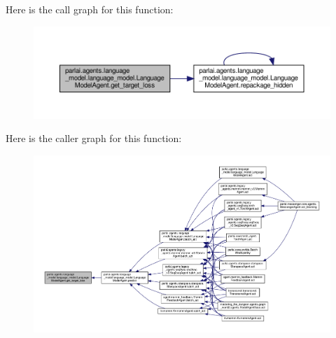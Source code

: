 Here is the call graph for this function\+:
\nopagebreak
\begin{figure}[H]
\begin{center}
\leavevmode
\includegraphics[width=350pt]{classparlai_1_1agents_1_1language__model_1_1language__model_1_1LanguageModelAgent_aeb1136a4ae2a2a1e8c0d5a7b75d9898f_cgraph}
\end{center}
\end{figure}
Here is the caller graph for this function\+:
\nopagebreak
\begin{figure}[H]
\begin{center}
\leavevmode
\includegraphics[width=350pt]{classparlai_1_1agents_1_1language__model_1_1language__model_1_1LanguageModelAgent_aeb1136a4ae2a2a1e8c0d5a7b75d9898f_icgraph}
\end{center}
\end{figure}
\mbox{\label{classparlai_1_1agents_1_1language__model_1_1language__model_1_1LanguageModelAgent_a3b1a39e1467680e19dccfcfb8dae4273}} 
